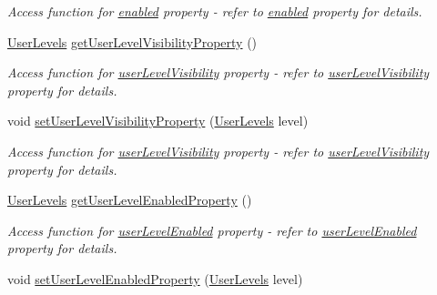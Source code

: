 \begin{DoxyCompactItemize}
\begin{DoxyCompactList}\small\item\em Access function for \hyperlink{classQEPeriodic_a3eb08b1082d27b46ee418415ed42affb}{enabled} property -\/ refer to \hyperlink{classQEPeriodic_a3eb08b1082d27b46ee418415ed42affb}{enabled} property for details. \end{DoxyCompactList}\item 
\hypertarget{classQEPeriodic_a1eb3ce64a0dc6183b1e83c1a73944925}{
\hyperlink{classQEPeriodic_a24429d342ac647985717bc5cb6a3d912}{UserLevels} \hyperlink{classQEPeriodic_a1eb3ce64a0dc6183b1e83c1a73944925}{getUserLevelVisibilityProperty} ()}
\label{classQEPeriodic_a1eb3ce64a0dc6183b1e83c1a73944925}

\begin{DoxyCompactList}\small\item\em Access function for \hyperlink{classQEPeriodic_ac0f4016896d8c021a28bfa34586f35ab}{userLevelVisibility} property -\/ refer to \hyperlink{classQEPeriodic_ac0f4016896d8c021a28bfa34586f35ab}{userLevelVisibility} property for details. \end{DoxyCompactList}\item 
\hypertarget{classQEPeriodic_a21645fc37e24b1ebef21053f3358f53c}{
void \hyperlink{classQEPeriodic_a21645fc37e24b1ebef21053f3358f53c}{setUserLevelVisibilityProperty} (\hyperlink{classQEPeriodic_a24429d342ac647985717bc5cb6a3d912}{UserLevels} level)}
\label{classQEPeriodic_a21645fc37e24b1ebef21053f3358f53c}

\begin{DoxyCompactList}\small\item\em Access function for \hyperlink{classQEPeriodic_ac0f4016896d8c021a28bfa34586f35ab}{userLevelVisibility} property -\/ refer to \hyperlink{classQEPeriodic_ac0f4016896d8c021a28bfa34586f35ab}{userLevelVisibility} property for details. \end{DoxyCompactList}\item 
\hypertarget{classQEPeriodic_a358cabc2e17750f75f9a9ffb3afc8244}{
\hyperlink{classQEPeriodic_a24429d342ac647985717bc5cb6a3d912}{UserLevels} \hyperlink{classQEPeriodic_a358cabc2e17750f75f9a9ffb3afc8244}{getUserLevelEnabledProperty} ()}
\label{classQEPeriodic_a358cabc2e17750f75f9a9ffb3afc8244}

\begin{DoxyCompactList}\small\item\em Access function for \hyperlink{classQEPeriodic_a0de902aca11667feca3158fa74be789f}{userLevelEnabled} property -\/ refer to \hyperlink{classQEPeriodic_a0de902aca11667feca3158fa74be789f}{userLevelEnabled} property for details. \end{DoxyCompactList}\item 
\hypertarget{classQEPeriodic_aba339c888734a29f82e6f84cbe9184f1}{
void \hyperlink{classQEPeriodic_aba339c888734a29f82e6f84cbe9184f1}{setUserLevelEnabledProperty} (\hyperlink{classQEPeriodic_a24429d342ac647985717bc5cb6a3d912}{UserLevels} level)}
\label{classQEPeriodic_aba339c888734a29f82e6f84cbe9184f1}


\end{DoxyCompactItemize}
